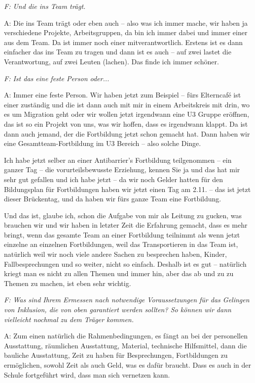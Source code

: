 \begin{linenumbers*}
\emph{F: Und die ins Team trägt.}

A: Die ins Team trägt oder eben auch -- also was ich immer mache, wir haben ja verschiedene Projekte, Arbeitsgruppen, da bin ich immer dabei und immer einer aus dem Team. Da ist immer noch einer mitverantwortlich. Erstens ist es dann einfacher das ins Team zu tragen und dann ist es auch – auf zwei lastet die Verantwortung, auf zwei Leuten (lachen). Das finde ich immer schöner.

\emph{F: Ist das eine feste Person oder...}

A: Immer eine feste Person. Wir haben jetzt zum Beispiel -- fürs Elterncafé ist einer zuständig und die ist dann auch mit mir in einem Arbeitskreis mit drin, wo es um Migration geht 
oder wir wollen jetzt irgendwann eine U3 Gruppe eröffnen, das ist so ein Projekt von uns, was wir hoffen, dass es irgendwann klappt. Da ist dann auch jemand, der die Fortbildung jetzt schon gemacht hat. Dann haben wir eine Gesamtteam-Fortbildung im U3 Bereich -- also solche Dinge. 

Ich habe jetzt selber an einer Antibarrier's Fortbildung teilgenommen -- ein ganzer Tag -- die vorurteilsbewusste Erziehung, kennen Sie ja und das hat mir sehr gut gefallen und ich habe jetzt -- da wir noch Gelder hatten für den Bildungsplan für Fortbildungen haben wir jetzt einen Tag am 2.11. – das ist jetzt dieser Brückentag, und da haben wir fürs ganze Team eine Fortbildung. 

Und das ist, glaube ich, schon die Aufgabe von mir als Leitung zu gucken, was brauchen wir und wir haben in letzter Zeit die Erfahrung gemacht, dass es mehr bringt, wenn das gesamte Team an einer Fortbildung teilnimmt als wenn jetzt einzelne an einzelnen Fortbildungen, weil das Transportieren in das Team ist, natürlich weil wir noch viele andere Sachen zu besprechen haben, Kinder, Fallbesprechungen und so weiter, nicht so einfach. Deshalb ist es gut -- natürlich kriegt man es nicht zu allen Themen und immer hin, aber das ab und zu zu Themen zu machen, ist eben sehr wichtig. 

\emph{F: Was sind Ihrem Ermessen nach notwendige Voraussetzungen für das Gelingen von Inklusion, die von oben garantiert werden sollten? So können wir dann vielleicht nochmal zu dem Träger kommen.}

A: Zum einen natürlich die Rahmenbedingungen, es fängt an bei der personellen Ausstattung, räumlichen Ausstattung, Material, technische Hilfsmittel, dann die bauliche Ausstattung, Zeit zu haben für Besprechungen, Fortbildungen zu ermöglichen, sowohl Zeit als auch Geld, was es dafür braucht. Dass es auch in der Schule fortgeführt wird, dass man sich vernetzen kann. 


\end{linenumbers*}
